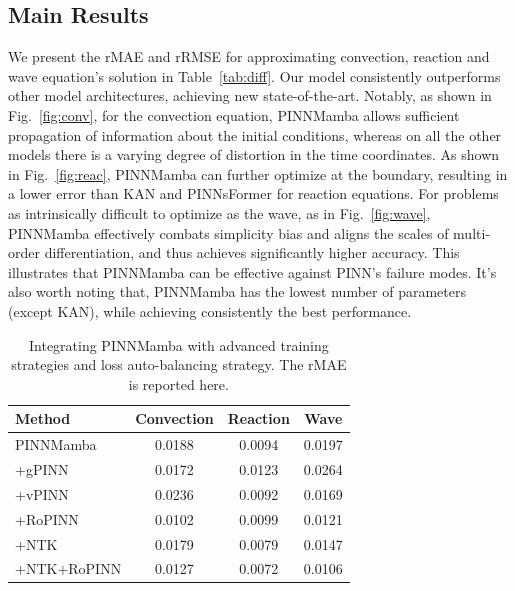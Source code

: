 \documentclass{article}
\theoremstyle{plain}
\theoremstyle{definition}
\theoremstyle{remark}
\begin{document}
\subsection{Main Results}
\vspace{-1mm}
We present the rMAE and rRMSE for approximating convection, reaction and wave equation's solution in Table~\ref{tab:diff}. Our model consistently outperforms other model architectures, achieving new state-of-the-art.
Notably, as shown in Fig.~\ref{fig:conv}, for the convection equation, PINNMamba allows sufficient propagation of information about the initial conditions, whereas on all the other models there is a varying degree of distortion in the time coordinates.
    As shown in Fig.~\ref{fig:reac}, PINNMamba can further optimize at the boundary, resulting in a lower error than KAN and PINNsFormer for reaction equations. For problems as intrinsically difficult to optimize as the wave, as in Fig.~\ref{fig:wave}, PINNMamba effectively combats simplicity bias and aligns the scales of multi-order differentiation, and thus achieves significantly higher accuracy. This illustrates that PINNMamba can be effective against PINN's failure modes. It's also worth noting that, PINNMamba has the lowest number of parameters (except KAN), while achieving consistently the best performance.

\begin{table}

  \caption{Integrating PINNMamba with advanced training strategies and loss auto-balancing strategy. The rMAE is reported here.}
  
  \centering
    \small
  \begin{tabular}{lccc}

    \toprule 
    Method & Convection & Reaction & Wave\\
   \midrule
   PINNMamba & 0.0188 & 0.0094 & 0.0197\\
   +gPINN & 0.0172& 0.0123 & 0.0264 \\
   +vPINN & 0.0236 & 0.0092& 0.0169\\
   +RoPINN & 0.0102& 0.0099& 0.0121\\
    \midrule
    +NTK &0.0179& 0.0079& 0.0147\\
    +NTK+RoPINN &0.0127& 0.0072& 0.0106\\
   

    \bottomrule
  \end{tabular}
  \normalsize
  \label{tab:para}
  \vspace{-3mm}
\end{table}
\end{document}
